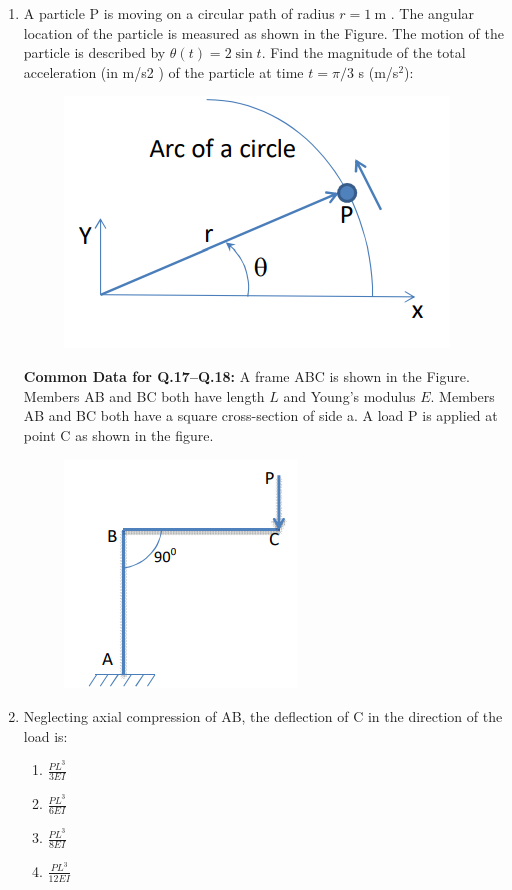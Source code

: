 \documentclass[journal,12pt,onecolumn]{IEEEtran}
\theoremstyle{remark}
\begin{document}
\begin{enumerate}
\item A  particle P is moving on a circular path of radius $r=1\ \mathrm{m}$ . The angular location  of the particle is
measured as shown in the Figure. The motion of the particle is described by $\theta(t)= 2\sin t$. Find the
magnitude of the total acceleration (in m/s2
) of the particle at time  $t=\pi/3$ s (m/s$^2$): \underline{\hspace{2cm}}

\begin{figure}[H]
    \centering
    \includegraphics[width=0.5\columnwidth]{figs/fig21.png}
    \caption{}
    \label{fig:fig21}
\end{figure}

 \textbf{Common Data for Q.17–Q.18:} A frame ABC is shown in the Figure. Members AB and BC both have length $L$ and Young’s modulus $E$. Members AB and BC both have a square cross-section of side a. A load P is applied at point C as
shown in the figure.

\begin{figure}[H]
    \centering
    \includegraphics[width=0.5\columnwidth]{figs/fig22.png}
    \caption{}
    \label{fig:fig22}
\end{figure}

\item Neglecting axial compression of AB, the deflection of C in the direction of the load is:

\begin{multicols}{2}
\begin{enumerate}
\item $\frac{P L^3}{3EI}$
\item $\frac{P L^3}{6EI}$
\item $\frac{P L^3}{8EI}$
\item $\frac{P L^3}{12EI}$
\end{enumerate}
\end{multicols}


\end{enumerate}
\end{document}
